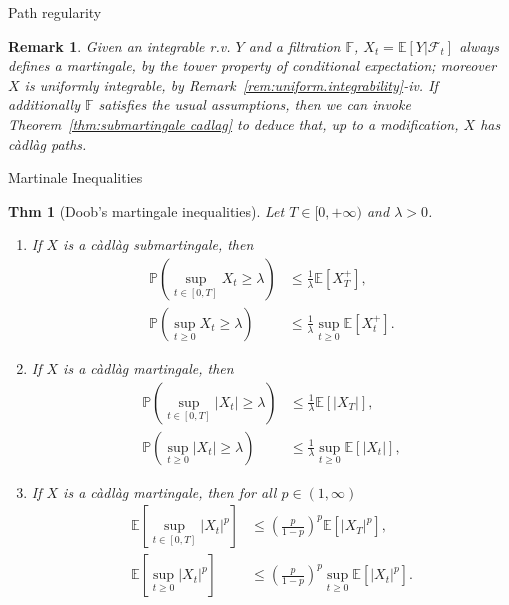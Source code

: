 \documentclass[a4paper]{article}
\theoremstyle{mytheoremstyle}
\newtheorem{theorem}{Thm}
\newtheorem*{remark}{Remark}
\newcommand{\1}{\mathds{1}}
\begin{document}
\begin{multicols*}{3}
\begin{roundbox}{Path regularity}
\begin{remark}
  \label{rem:basic.martingale}Given an integrable r.v. $Y$ and a filtration
  $\mathbb{F}$, $X_t =\mathbb{E} [Y| \mathcal{F}_t]$ always defines a
  martingale, by the tower property of conditional expectation; moreover $X$
  is uniformly integrable, by Remark~\ref{rem:uniform.integrability}-iv. If
  additionally $\mathbb{F}$ satisfies the usual assumptions, then we can
  invoke Theorem~\ref{thm:submartingale cadlag} to deduce that, up to a
  modification, $X$ has c{\`a}dl{\`a}g paths.
\end{remark}
\end{roundbox}

\begin{roundbox}{Martinale Inequalities}
\begin{theorem}[Doob's martingale inequalities]
  \label{thm:doob}Let $T \in [0, + \infty)$ and $\lambda > 0$.
  \begin{enumerate}
    \item If $X$ is a c{\`a}dl{\`a}g submartingale, then
    \begin{align*}
      \mathbb{P} \left( \sup_{t \in [0, T]} X_t \geqslant \lambda \right)
      &\leqslant \frac{1}{\lambda} \mathbb{E} [X_T^+], \\
      \mathbb{P} \left( \sup_{t \geqslant 0} X_t \geqslant \lambda \right)
      & \leqslant \frac{1}{\lambda} \sup_{t \geqslant 0} \mathbb{E} [X_t^+] .
     \end{align*}
    \item If $X$ is a c{\`a}dl{\`a}g martingale, then
    \begin{align*}
      \mathbb{P} \left( \sup_{t \in [0, T]} |X_t | \geqslant \lambda \right)
      & \leqslant \frac{1}{\lambda} \mathbb{E} [|X_T |], \\
      \mathbb{P} \left( \sup_{t \geqslant 0} |X_t | \geqslant \lambda \right)
      & \leqslant \frac{1}{\lambda} \sup_{t \geqslant 0} \mathbb{E} [|X_t |], 
     \end{align*}
    \item If $X$ is a c{\`a}dl{\`a}g martingale, then for all $p \in (1, \infty)$
    \begin{align*}
      \mathbb{E} \left[ \sup_{t \in [0, T]} |X_t |^p \right] 
      &\leqslant \left( \frac{p}{1-p} \right)^p \mathbb{E} [|X_T |^p], \\
      \mathbb{E} \left[ \sup_{t \geqslant 0} |X_t |^p \right] 
      &\leqslant \left( \frac{p}{1-p} \right)^p \sup_{t \geqslant 0} \mathbb{E} [|X_t |^p] .
   \end{align*}
  \end{enumerate}
\end{theorem}


\end{roundbox}
\end{multicols*}
\end{document}
